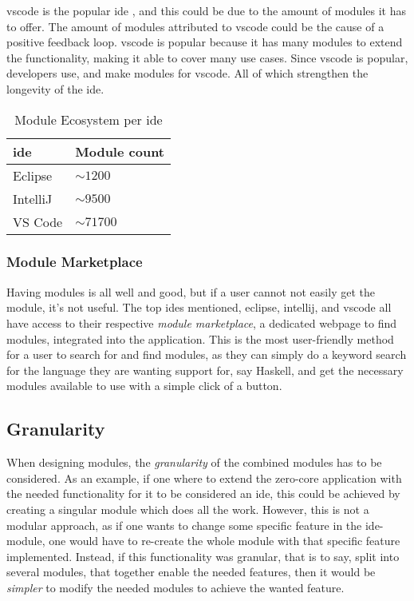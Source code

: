 \gls{vscode} is the popular \gls{ide} \cite{topIde}, and this could be due to
the amount of modules it has to offer. The amount of modules attributed to
\gls{vscode} could be the cause of a positive feedback loop. \gls{vscode} is
popular because it has many modules to extend the functionality, making it able
to cover many use cases. Since \gls{vscode} is popular, developers use, and make
modules for \gls{vscode}. All of which strengthen the longevity of the
\gls{ide}.

\begin{table}[]
  \centering
  \caption{Module Ecosystem per \gls{ide}}
  \label{tbl:mod}
  \begin{tabular}{|l|l|}
    \hline
    \gls{ide} & Module count \\ \hline
    Eclipse & $\sim1200$ \\ \hline
    IntelliJ & $\sim9500$ \\ \hline
    VS Code & $\sim71700$ \\ \hline
  \end{tabular}
\end{table}

\subsubsection{Module Marketplace}

Having modules is all well and good, but if a user cannot not easily get the
module, it's not useful. The top \gls{ide}s mentioned, \gls{eclipse},
\gls{intellij}, and \gls{vscode} all have access to their respective
\textit{module marketplace}, a dedicated webpage to find modules, integrated
into the application. This is the most user-friendly method for a user to search
for and find modules, as they can simply do a keyword search for the language
they are wanting support for, say Haskell, and get the necessary modules
available to use with a simple click of a button.

\subsection{Granularity}

When designing modules, the \textit{granularity} of the combined modules has to
be considered. As an example, if one where to extend the zero-core application
with the needed functionality for it to be considered an \gls{ide}, this could be
achieved by creating a singular module which does all the work. However, this
is not a modular approach, as if one wants to change some specific feature in
the \gls{ide}-module, one would have to re-create the whole module with that
specific feature implemented. Instead, if this functionality was granular,
that is to say, split into several modules, that together enable the needed
features, then it would be \textit{simpler} to modify the needed modules to
achieve the wanted feature.


